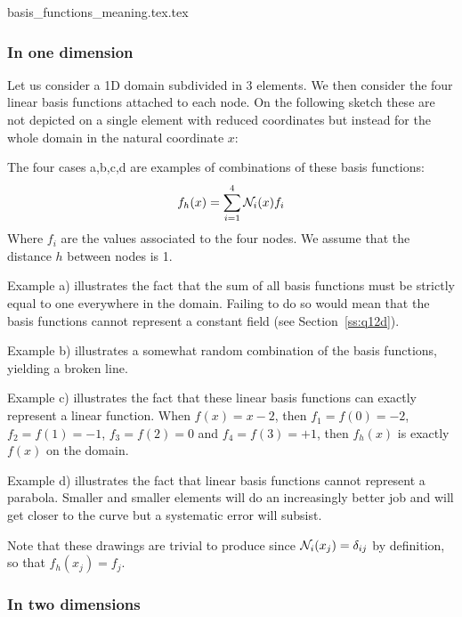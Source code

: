 \begin{flushright} {\tiny {\color{gray} basis\_functions\_meaning.tex.tex}} \end{flushright}


\subsubsection{In one dimension}

Let us consider a 1D domain subdivided in 3 elements. We then consider the four linear basis functions 
attached to each node. On the following sketch these are not depicted on a single element with 
reduced coordinates but instead for the whole domain in the natural coordinate $x$:



The four cases a,b,c,d are examples of combinations of these basis functions:
\[
f_h(x)=\sum_{i=1}^4 {\mathcal{N}}_i(x) f_i
\]
Where $f_i$ are the values associated to the four nodes. 
We assume that the distance $h$ between nodes is 1.

Example a) illustrates the fact that the sum of all basis functions must be strictly equal to one everywhere
in the domain. Failing to do so would mean that the basis functions cannot represent a constant field (see
Section~\ref{ss:q12d}). 

Example b) illustrates a somewhat random combination of the basis functions, yielding a broken line. 

Example c) illustrates the fact that these linear basis functions can exactly represent a
linear function. When $f(x)=x-2$, then $f_1=f(0)=-2$, $f_2=f(1)=-1$, $f_3=f(2)=0$ and $f_4=f(3)=+1$, 
then $f_h(x)$ is exactly $f(x)$ on the domain.

Example d) illustrates the fact that linear basis functions cannot represent a parabola. Smaller and 
smaller elements will do an increasingly better job and will get closer to the curve but a 
systematic error will subsist.  


Note that these drawings are trivial to produce since ${\mathcal{N}}_i(x_j)=\delta_{ij}$ by definition, so that 
$f_h(x_j)=f_j$.

\subsubsection{In two dimensions}



